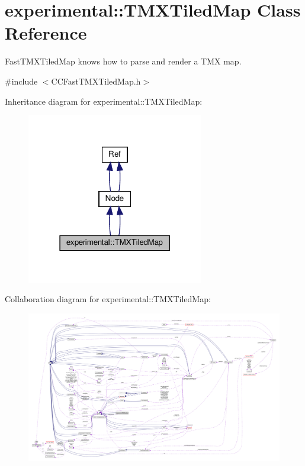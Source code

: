 \hypertarget{classexperimental_1_1TMXTiledMap}{}\section{experimental\+:\+:T\+M\+X\+Tiled\+Map Class Reference}
\label{classexperimental_1_1TMXTiledMap}


Fast\+T\+M\+X\+Tiled\+Map knows how to parse and render a T\+MX map.  




{\ttfamily \#include $<$C\+C\+Fast\+T\+M\+X\+Tiled\+Map.\+h$>$}



Inheritance diagram for experimental\+:\+:T\+M\+X\+Tiled\+Map\+:
\nopagebreak
\begin{figure}[H]
\begin{center}
\leavevmode
\includegraphics[width=219pt]{classexperimental_1_1TMXTiledMap__inherit__graph}
\end{center}
\end{figure}


Collaboration diagram for experimental\+:\+:T\+M\+X\+Tiled\+Map\+:
\nopagebreak
\begin{figure}[H]
\begin{center}
\leavevmode
\includegraphics[width=350pt]{classexperimental_1_1TMXTiledMap__coll__graph}
\end{center}
\end{figure}
